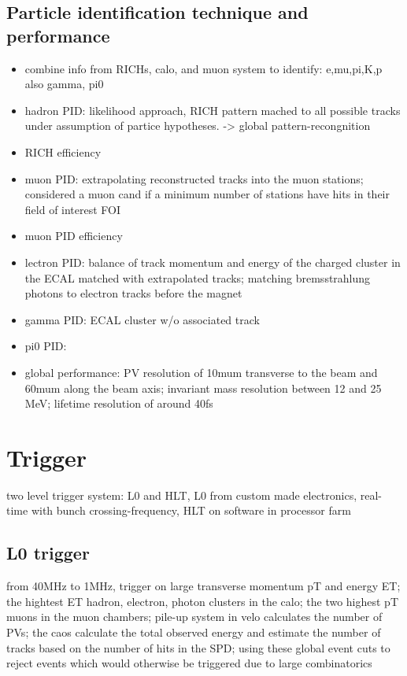\subsection{Particle identification technique and performance}
\begin{itemize}
  \item combine info from RICHs, calo, and muon system to identify: e,mu,pi,K,p also gamma, pi0
  \item hadron PID: likelihood approach, RICH pattern mached to all possible tracks under assumption of partice hypotheses. -> global pattern-recongnition
  \item RICH efficiency
  \item muon PID: extrapolating reconstructed tracks into the muon stations; considered a muon cand if a minimum number of stations have hits in their field of interest FOI
  \item muon PID efficiency
  \item lectron PID: balance of track momentum and energy of the charged cluster in the ECAL matched with extrapolated tracks; matching bremsstrahlung photons to electron tracks before the magnet
  \item gamma PID: ECAL cluster w/o associated track
  \item pi0 PID: 
  \item global performance: PV resolution of 10mum transverse to the beam and 60mum along the beam axis; invariant mass resolution between 12 and 25 MeV; lifetime resolution of around 40fs
\end{itemize}

\section{Trigger}
two level trigger system: L0 and HLT, L0 from custom made electronics, real-time with bunch crossing-frequency, HLT on software in processor farm
\subsection{L0 trigger}
from 40MHz to 1MHz, trigger on large transverse momentum pT and energy ET; the hightest ET hadron, electron, photon clusters in the calo; the two highest pT muons in the muon chambers; pile-up system in velo calculates the number of PVs; the caos calculate the total observed energy and estimate the number of tracks based on the number of hits in the SPD; using these global event cuts to reject events which would otherwise be triggered due to large combinatorics
